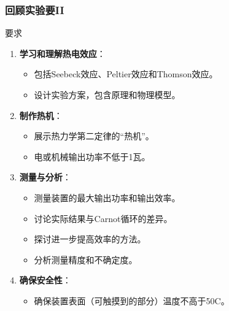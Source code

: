 \documentclass[aspectratio=169]{beamer}
\begin{document}
	\begin{frame}
		\frametitle{回顾实验要II}
		
		\begin{block}{要求}
			\begin{enumerate}
				\item \textbf{学习和理解热电效应}：
				\begin{itemize}
					\scriptsize \item 包括Seebeck效应、Peltier效应和Thomson效应。
					\item \scriptsize 设计实验方案，包含原理和物理模型。
				\end{itemize}
				
				\item \textbf{制作热机}：
				\begin{itemize}
					\scriptsize \item \scriptsize 展示热力学第二定律的“热机”。
					\item \scriptsize 电或机械输出功率不低于1瓦。
				\end{itemize}
				
				\item \textbf{测量与分析}：
				\begin{itemize}
					\scriptsize \item \scriptsize 测量装置的最大输出功率和输出效率。
					\item \scriptsize 讨论实际结果与Carnot循环的差异。
					\item \scriptsize 探讨进一步提高效率的方法。
					\item \scriptsize 分析测量精度和不确定度。
				\end{itemize}
				
				\item \textbf{确保安全性}：
				\begin{itemize}
					\scriptsize \item \scriptsize 确保装置表面（可触摸到的部分）温度不高于50\degree C。
				\end{itemize}
			\end{enumerate}
		\end{block}
	\end{frame}
	
\end{document}
